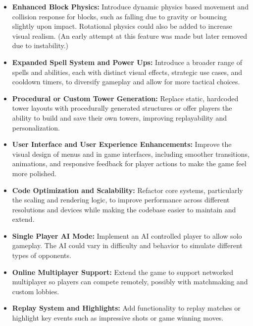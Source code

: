 \documentclass[10.5pt]{article}
\begin{document}
\begin{itemize}
    \item \textbf{Enhanced Block Physics:} Introduce dynamic physics based movement and collision response for blocks, such as falling due to gravity or bouncing slightly upon impact. Rotational physics could also be added to increase visual realism. (An early attempt at this feature was made but later removed due to instability.)
    
    \item \textbf{Expanded Spell System and Power Ups:} Introduce a broader range of spells and abilities, each with distinct visual effects, strategic use cases, and cooldown timers, to diversify gameplay and allow for more tactical choices.
    
    \item \textbf{Procedural or Custom Tower Generation:} Replace static, hardcoded tower layouts with procedurally generated structures or offer players the ability to build and save their own towers, improving replayability and personalization.
    
    \item \textbf{User Interface and User Experience Enhancements:} Improve the visual design of menus and in game interfaces, including smoother transitions, animations, and responsive feedback for player actions to make the game feel more polished.
    
    \item \textbf{Code Optimization and Scalability:} Refactor core systems, particularly the scaling and rendering logic, to improve performance across different resolutions and devices while making the codebase easier to maintain and extend.
    
    \item \textbf{Single Player AI Mode:} Implement an AI controlled player to allow solo gameplay. The AI could vary in difficulty and behavior to simulate different types of opponents.
    
    \item \textbf{Online Multiplayer Support:} Extend the game to support networked multiplayer so players can compete remotely, possibly with matchmaking and custom lobbies.
    
    \item \textbf{Replay System and Highlights:} Add functionality to replay matches or highlight key events such as impressive shots or game winning moves.
\end{itemize}
\end{document}
